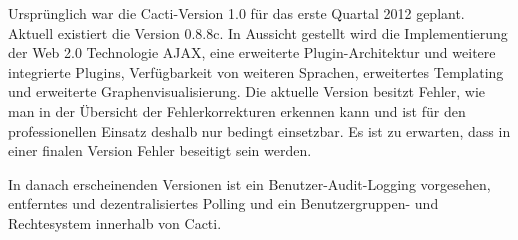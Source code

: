 \documentclass[12pt,ngerman,toc=listofnumbered,toc=bibliographynumbered,toc=index,headsepline=true]{scrbook}
\begin{document}
Ursprünglich war die Cacti-Version 1.0 für das erste Quartal 2012 geplant.
Aktuell existiert die Version 0.8.8c. In Aussicht gestellt wird die
Implementierung der Web 2.0 Technologie AJAX, eine erweiterte Plugin-Architektur
und weitere integrierte Plugins, Verfügbarkeit von weiteren Sprachen,
erweitertes Templating und erweiterte Graphenvisualisierung. Die aktuelle
Version besitzt Fehler, wie man in der Übersicht der Fehlerkorrekturen erkennen
kann und ist für den professionellen Einsatz deshalb nur bedingt einsetzbar. Es
ist zu erwarten, dass in einer finalen Version Fehler beseitigt sein werden.

In danach erscheinenden Versionen ist ein Benutzer-Audit-Logging vorgesehen,
entferntes und dezentralisiertes Polling und ein Benutzergruppen- und
Rechtesystem innerhalb von Cacti.
\end{document}
